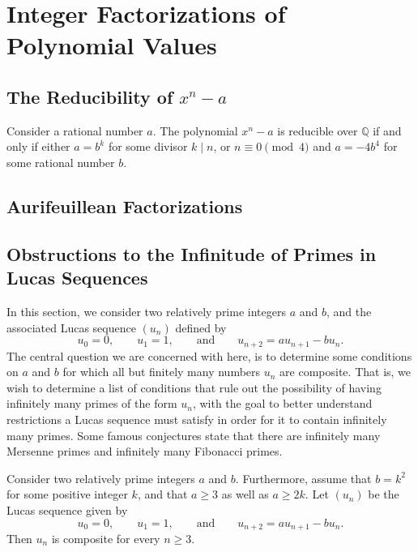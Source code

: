 \chapter{Integer Factorizations of Polynomial Values}

\section{The Reducibility of \texorpdfstring{$x^n-a$}{xⁿ-a}}

\begin{theorem}
  Consider a rational number $a$. The polynomial $x^n-a$ is reducible over $\mathbb{Q}$ if and only if either $a=b^k$ for some divisor $k\mid n$, or $n\equiv 0\pmod{4}$ and $a=-4b^4$ for some rational number $b$.
\end{theorem}

\section{Aurifeuillean Factorizations}

\section{Obstructions to the Infinitude of Primes in Lucas Sequences}

In this section, we consider two relatively prime integers $a$ and $b$, and the associated Lucas sequence $(u_n)$ defined by
\begin{equation*}
  u_0=0,\qquad u_1=1,\qquad\text{and}\qquad u_{n+2}=au_{n+1}-bu_n.
\end{equation*}
The central question we are concerned with here, is to determine some conditions on $a$ and $b$ for which all but finitely many numbers $u_n$ are composite. That is, we wish to determine a list of conditions that rule out the possibility of having infinitely many primes of the form $u_n$, with the goal to better understand restrictions a Lucas sequence must satisfy in order for it to contain infinitely many primes. Some famous conjectures state that there are infinitely many Mersenne primes and infinitely many Fibonacci primes.

\begin{theorem}
  Consider two relatively prime integers $a$ and $b$. Furthermore, assume that $b=k^2$ for some positive integer $k$, and that $a\geq 3$ as well as $a\geq 2k$. Let $(u_n)$ be the Lucas sequence given by
  \begin{equation*}
    u_0=0,\qquad u_1=1,\qquad\text{and}\qquad u_{n+2}=a u_{n+1}-b u_n.
  \end{equation*}
  Then $u_n$ is composite for every $n\ge 3$.
\end{theorem}

